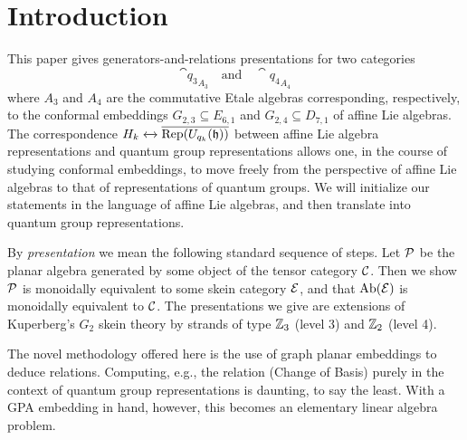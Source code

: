 \section{Introduction}

This paper gives generators-and-relations presentations for two categories 
\[
    \cat{q_3}_{A_3} \quad \text{and} \quad \cat{q_4}_{A_4}
\] 
where $A_3$ and $A_4$ are the commutative Etale algebras corresponding, respectively, to the conformal embeddings $G_{2,3} \subseteq E_{6,1}$ and $G_{2,4} \subseteq D_{7,1}$ of affine Lie algebras. 
The correspondence $H_k \xleftrightarrow{} \overline{\operatorname{Rep}(U_{q_k}(\mathfrak{h}))}$ between affine Lie algebra representations and quantum group representations \cite{} allows one, in the course of studying conformal embeddings, to move freely from the perspective of affine Lie algebras to that of representations of quantum groups. 
We will initialize our statements in the language of affine Lie algebras, and then translate into quantum group representations.

By {\it presentation} we mean the following standard sequence of steps. 
Let $\mathcal{P}$ be the planar algebra generated by some object of the tensor category $\mathcal{C}$. 
Then we show $\mathcal{P}$ is monoidally equivalent to some skein category $\mathcal{E}$, and that $\operatorname{Ab}(\mathcal{E})$ is monoidally equivalent to $\mathcal{C}$. 
The presentations we give are extensions of Kuperberg's $G_2$ skein theory by strands of type $\mathbb{Z}_3$ (level 3) and $\mathbb{Z}_2$ (level 4). 

The novel methodology offered here is the use of graph planar embeddings to deduce relations. 
Computing, e.g., the relation (Change of Basis) purely in the context of quantum group representations is daunting, to say the least. 
With a GPA embedding in hand, however, this becomes an elementary linear algebra problem. 